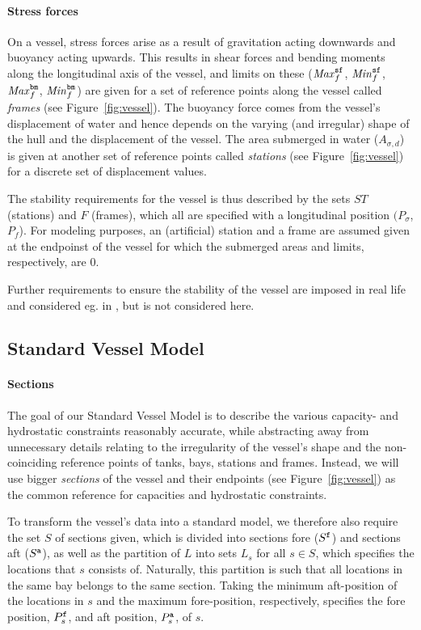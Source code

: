 \paragraph{Stress forces}
On a vessel, stress forces arise as a result of gravitation acting downwards and buoyancy acting upwards. This results in shear forces and bending moments along the longitudinal axis of the vessel, and limits on these ($\mathit{Max}^{\texttt{sf}}_f$, $\mathit{Min}^{\texttt{sf}}_f$, $\mathit{Max}^{\texttt{bm}}_f$, $\mathit{Min}^{\texttt{bm}}_f$) are given for a set of reference points along the vessel called \emph{frames} (see Figure~\ref{fig:vessel}). 
%
The buoyancy force comes from the vessel's displacement of water and hence depends on the varying (and irregular) shape of the hull and the displacement of the vessel. The area submerged in water ($A_{\sigma,d}$) is given at another set of reference points called \emph{stations} (see Figure~\ref{fig:vessel}) for a discrete set of displacement values.   

The stability requirements for the vessel is thus described by the sets $ST$ (stations) and $F$ (frames), which all are specified with a longitudinal position $(P_\sigma$, $P_f$). For modeling purposes, an (artificial) station and a frame are assumed given at the endpoinst of the vessel for which the submerged areas and limits, respectively, are 0.

Further requirements to ensure the stability of the vessel are imposed in real life and considered eg. in \cite{AlbertosThesis}, but is not considered here.

\subsection*{Standard Vessel Model}
\paragraph{Sections}
The goal of our Standard Vessel Model is to describe the various capacity- and hydrostatic constraints reasonably accurate, while abstracting away from unnecessary details relating to the irregularity of the vessel's shape and the non-coinciding reference points of tanks, bays, stations and frames. Instead, we will use bigger \emph{sections} of the vessel and their endpoints (see Figure~\ref{fig:vessel}) as the common reference for capacities and hydrostatic constraints.
 
To transform the vessel's data into a standard model, we therefore also require the set $S$ of sections given, which is divided into sections fore ($S^{\texttt{f}}$) and sections aft ($S^{\texttt{a}}$), as well as the partition of $L$ into sets $L_s$ for all $s\in S$, which specifies the locations that $s$ consists of. Naturally, this partition is such that all locations in the same bay belongs to the same section. Taking the minimum aft-position of the locations in $s$ and the maximum fore-position, respectively, specifies the fore position, $P^{\texttt{f}}_s$, and aft position, $P^{\texttt{a}}_s$, of $s$.

